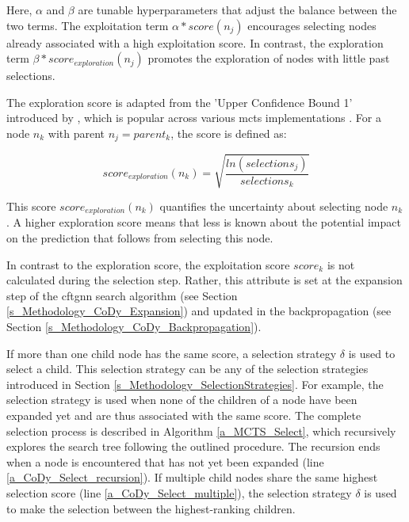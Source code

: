 Here, $\alpha$ and $\beta$ are tunable hyperparameters that adjust the balance between the two terms. The exploitation term $\alpha * score(n_j)$ encourages selecting nodes already associated with a high exploitation score. In contrast, the exploration term $\beta * score_{exploration}(n_j)$ promotes the exploration of nodes with little past selections.

The exploration score is adapted from the 'Upper Confidence Bound 1' introduced by \cite{auer_finite-time_2002}, which is popular across various \gls{mcts} implementations \cite{kocsis_bandit_2006, browne_survey_2012}. For a node $n_k$ with parent $n_j = parent_k$, the score is defined as:

\begin{equation}
    score_{exploration}(n_k) = \sqrt{\frac{ln(selections_j)}{selections_k}}
\end{equation}

This score $score_{exploration}(n_k)$ quantifies the uncertainty about selecting node $n_k$ \cite{auer_finite-time_2002, browne_survey_2012}. A higher exploration score means that less is known about the potential impact on the prediction that follows from selecting this node.

In contrast to the exploration score, the exploitation score $score_k$ is not calculated during the selection step. Rather, this attribute is set at the expansion step of the \gls{cftgnn} search algorithm (see Section \ref{s_Methodology_CoDy_Expansion}) and updated in the backpropagation (see Section \ref{s_Methodology_CoDy_Backpropagation}).

If more than one child node has the same score, a selection strategy $\delta$ is used to select a child. This selection strategy can be any of the selection strategies introduced in Section \ref{s_Methodology_SelectionStrategies}. For example, the selection strategy is used when none of the children of a node have been expanded yet and are thus associated with the same score. The complete selection process is described in Algorithm \ref{a_MCTS_Select}, which recursively explores the search tree following the outlined procedure. The recursion ends when a node is encountered that has not yet been expanded (line \ref{a_CoDy_Select_recursion}). If multiple child nodes share the same highest selection score (line \ref{a_CoDy_Select_multiple}), the selection strategy $\delta$ is used to make the selection between the highest-ranking children.

